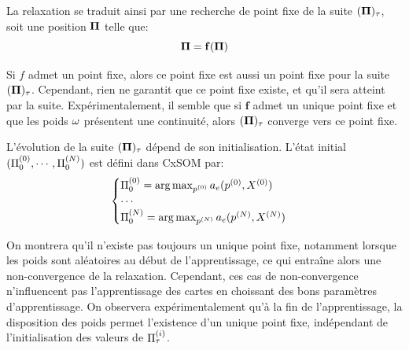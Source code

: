La relaxation se traduit ainsi par une recherche de point fixe de la suite $(\mathbf{\Pi})_{\tau}$, soit une position $\mathbf{\Pi}$ telle que:
\begin{equation}
\mathbf{\Pi} = \mathbf{f}(\mathbf{\Pi})
\label{eq:suite}
\end{equation}

Si $f$ admet un point fixe, alors ce point fixe est aussi un point fixe pour la suite $(\mathbf{\Pi})_\tau$. Cependant, rien ne garantit que ce point fixe existe, et qu'il sera atteint par la suite. Expérimentalement, il semble que si $\mathbf{f}$ admet un unique point fixe et que les poids $\omega$ présentent une continuité, alors $(\mathbf{\Pi})_{\tau}$ converge vers ce point fixe. 

L'évolution de la suite $(\mathbf{\Pi})_{\tau}$ dépend de son initialisation.
L'état initial $(\Pi^{({0})}_0, \cdots , \Pi^{({N})}_0)$ est défini dans CxSOM par: 
\begin{equation}
\begin{cases}
\Pi^{({0})}_0 = \operatorname*{arg\,max}_{p^{({0})}} a_e(p^{({0})},X^{({0})})\\
\cdots \\
\Pi^{({N})}_0 = \operatorname*{arg\,max}_{p^{({N})}} a_e(p^{({N})},X^{({N})})\\
\end{cases}
\label{eq:init}
\end{equation}

On montrera qu'il n'existe pas toujours un unique point fixe, notamment lorsque les poids sont aléatoires au début de l'apprentissage, ce qui entraîne alors une non-convergence de la relaxation. Cependant, ces cas de non-convergence n'influencent pas l'apprentissage des cartes en choissant des bons paramètres d'apprentissage. On observera expérimentalement qu'à la fin de l'apprentissage, la disposition des poids permet l'existence d'un unique point fixe, indépendant de l'initialisation des valeurs de $\Pi^{({i})}_{\tau}$.


